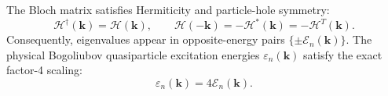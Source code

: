 \begin{proposition}
\label{prop:m1_2_spectral_symmetries}
The Bloch matrix satisfies Hermiticity and particle-hole symmetry:
\begin{equation}
\label{eq:m1_2_hermiticity_phs}
\mathcal{H}^\dagger(\mathbf{k}) = \mathcal{H}(\mathbf{k}), \qquad \mathcal{H}(-\mathbf{k}) = -\mathcal{H}^*(\mathbf{k}) = -\mathcal{H}^T(\mathbf{k}).
\end{equation}
Consequently, eigenvalues appear in opposite-energy pairs $\{\pm \mathcal{E}_n(\mathbf{k})\}$. The physical Bogoliubov quasiparticle excitation energies $\varepsilon_n(\mathbf{k})$ satisfy the exact factor-4 scaling:
\begin{equation}
\label{eq:m1_2_factor_4_excitation}
\varepsilon_n(\mathbf{k}) = 4 \mathcal{E}_n(\mathbf{k}).
\end{equation}
\end{proposition}
